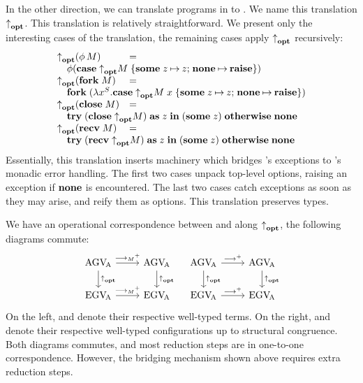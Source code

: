 \documentclass[sigplan,screen,review]{acmart}
\begin{document}
In the other direction, we can translate programs in \affineAGV to \affineEGV. We name this translation $\relax{{\uparrow}_{\mathbf{opt}}}\relax{}$. This translation is relatively straightforward. We present only the interesting cases of the translation, the remaining cases apply $\relax{{\uparrow}_{\mathbf{opt}}}\relax{}$ recursively:
\[
  \begin{array}{lcl}
    \mta{\parens{\rvThread{\phi}{M}}}
    & = &
    \\
    \multicolumn{3}{l}{%
    \quad\gvThread{\phi}{\parens{\gvCaseOpt{\mta{M}}{z}{z}{\gvRaise}}}}
    \\
    \mta{\parens{\gvFork{M}}}
    & = &
    \\
    \multicolumn{3}{l}{%
    \quad\gvFork{\parens{\gvAbs[S]{x}{\gvCaseOpt{\gvApp{\mta{M}}{x}}{z}{z}{\gvRaise}}}}}
    \\
    \mta{\parens{\gvClose{M}}}
    & = &
    \\
    \multicolumn{3}{l}{%
    \quad\gvTry{\parens{\gvClose{\mta{M}}}}{z}{\parens{\gvSome{z}}}{\gvNone}}
    \\
    \mta{\parens{\gvRecv{M}}}
    & = &
    \\
    \multicolumn{3}{l}{%
    \quad\gvTry{\parens{\gvRecv{\mta{M}}}}{z}{\parens{\gvSome{z}}}{\gvNone}}
  \end{array}
\]
Essentially, this translation inserts machinery which bridges \affineEGV's exceptions to \affineAGV's monadic error handling. The first two cases unpack top-level options, raising an exception if $\relax{\mathbf{none}}$ is encountered. The last two cases catch exceptions as soon as they may arise, and reify them as options.
This translation preserves types.

We have an operational correspondence between \affineAGV and \affineEGV along $\relax{{\uparrow}_{\mathbf{opt}}}\relax{}$, \ie the following diagrams commute:
\[
  \begin{tikzcd}
    \affineAGV
    \rar{\gvRedArrPure^+}
    \dar{\mta{}}
    &
    \affineAGV
    \dar{\mta{}}
    \\
    \affineEGV
    \rar{\gvRedArrPure^+}
    &
    \affineEGV
  \end{tikzcd}
  \quad
  \begin{tikzcd}
    \affineAGV
    \rar{\gvRedArr^+}
    \dar{\mta{}}
    &
    \affineAGV
    \dar{\mta{}}
    \\
    \affineEGV
    \rar{\gvRedArr^+}
    &
    \affineEGV
  \end{tikzcd}
\]
On the left, \affineAGV and \affineEGV denote their respective well-typed terms. On the right, \affineAGV and \affineEGV denote their respective well-typed configurations up to structural congruence. Both diagrams commutes, and most reduction steps are in one-to-one correspondence. However, the bridging mechanism shown above requires extra reduction steps.
\end{document}
